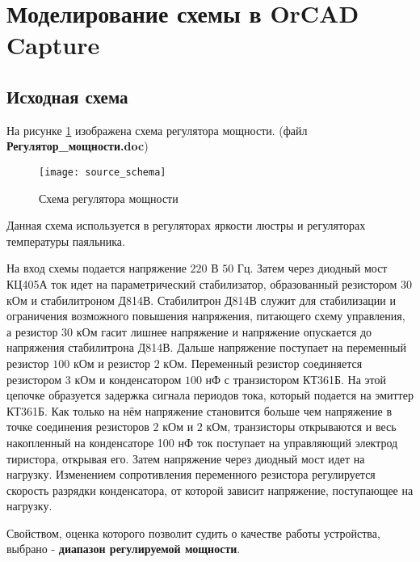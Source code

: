 





\newpage

\section{Моделирование схемы в OrCAD Capture}

\subsection{Исходная схема}

На рисунке \ref{pic:scheme} изображена схема регулятора мощности. (файл \textbf{Регулятор\_мощности.doc})

\begin{figure}[H]
\begin{center}
	\texttt{[image: source\_schema]}
	\caption{Схема регулятора мощности}
	\label{pic:scheme}
\end{center}
\end{figure}

Данная схема используется в регуляторах яркости люстры и регуляторах температуры паяльника.

На вход схемы подается напряжение $220$ В $50$ Гц. Затем через диодный мост КЦ405А ток идет на параметрический стабилизатор, образованный резистором $30$ кОм и стабилитроном Д814В. Стабилитрон Д814В служит для стабилизации и ограничения возможного повышения напряжения, питающего схему управления, а резистор $30$ кОм гасит лишнее напряжение и напряжение опускается до напряжения стабилитрона Д814В. Дальше напряжение поступает на переменный резистор $100$ кОм и резистор $2$ кОм. Переменный резистор соединяется резистором $3$ кОм и конденсатором $100$ нФ с транзистором КТ361Б. На этой цепочке образуется задержка сигнала периодов тока, который подается на эмиттер КТ361Б. Как только на нём напряжение становится больше чем напряжение в точке соединения резисторов $2$ кОм и $2$ кОм, транзисторы открываются и весь накопленный на конденсаторе 100 нФ ток поступает на управляющий электрод тиристора, открывая его. Затем напряжение через диодный мост идет на нагрузку. Изменением сопротивления переменного резистора регулируется скорость разрядки конденсатора, от которой зависит напряжение, поступающее на нагрузку.

Свойством, оценка которого позволит судить о качестве работы устройства, выбрано - \textbf{диапазон регулируемой мощности}.

